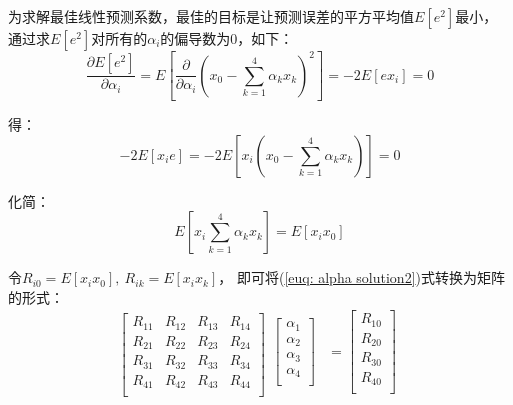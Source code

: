 \documentclass[12pt,a4paper]{article}%
\begin{document}
为求解最佳线性预测系数，最佳的目标是让预测误差的平方平均值$E[e^2]$最小，
通过求$E[e^2]$对所有的$\alpha_i$的偏导数为$0$，如下：
\begin{equation}
    \frac{\partial E\left[ e^2 \right]}{\partial \alpha_i}=E\left[
        \frac{\partial}{\partial \alpha_i}\left( x_0-\sum_{k=1}^4{\alpha_k x_k} \right) ^2
        \right] =-2E\left[ ex_i \right] =0
    \label{equ: the best weight}
\end{equation}

得：
\begin{equation}
    -2E\left[ x_ie \right] =-2E\left[ x_i\left( x_0-\sum_{k=1}^4{\alpha_kx_k} \right) \right] =0
    \label{euq: alpha solution1}
\end{equation}

化简：
\begin{equation}
    E\left[ x_i\sum_{k=1}^4{\alpha_kx_k} \right] =E\left[ x_ix_0 \right]
    \label{euq: alpha solution2}
\end{equation}

令$R_{i0}=E\left[ x_ix_0 \right] ,\ R_{ik}=E\left[ x_ix_k \right]$，
即可将(\ref{euq: alpha solution2})式转换为矩阵的形式：
\begin{equation}
    \left[ \begin{matrix}
            R_{11} & R_{12} & R_{13} & R_{14} \\
            R_{21} & R_{22} & R_{23} & R_{24} \\
            R_{31} & R_{32} & R_{33} & R_{34} \\
            R_{41} & R_{42} & R_{43} & R_{44} \\
        \end{matrix} \right] \begin{matrix}
        \left[ \begin{array}{c}
                       \alpha_1 \\
                       \alpha_2 \\
                       \alpha_3 \\
                       \alpha_4 \\
                   \end{array} \right] & =\left[ \begin{array}{c}
                                                     R_{10} \\
                                                     R_{20} \\
                                                     R_{30} \\
                                                     R_{40} \\
                                                 \end{array} \right] \\
    \end{matrix}
    \label{equ: matrix of weight}
\end{equation}
\end{document}
